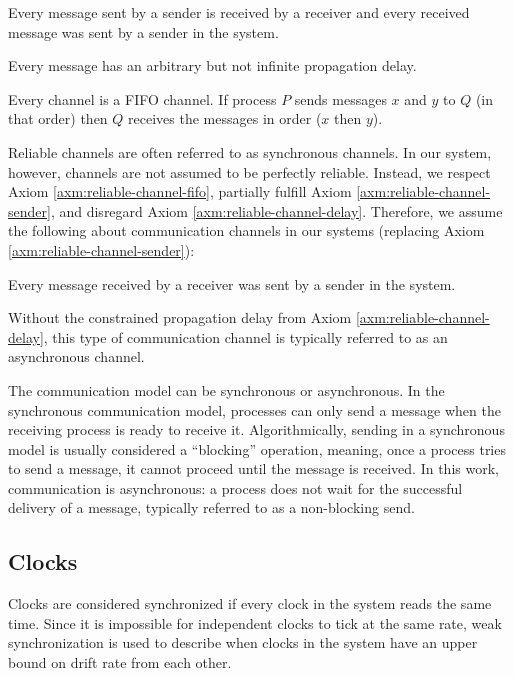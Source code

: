 \begin{axm}
    \label{axm:reliable-channel-sender}
    Every message sent by a sender is received by a receiver and every received message was sent by a sender in the system. 
\end{axm}

\begin{axm}
    \label{axm:reliable-channel-delay}
    Every message has an arbitrary but not infinite propagation delay.
\end{axm}

\begin{axm}
    \label{axm:reliable-channel-fifo}
    Every channel is a \ac{FIFO} channel. If process $P$ sends messages $x$ and $y$ to $Q$ (in that order) then $Q$ receives the messages in order ($x$ then $y$).
\end{axm}

Reliable channels are often referred to as synchronous channels.
In our system, however, channels are not assumed to be perfectly reliable.
Instead, we respect Axiom \ref{axm:reliable-channel-fifo}, partially fulfill Axiom \ref{axm:reliable-channel-sender}, and disregard Axiom \ref{axm:reliable-channel-delay}.
Therefore, we assume the following about communication channels in our systems (replacing Axiom \ref{axm:reliable-channel-sender}):

\begin{axm}
    Every message received by a receiver was sent by a sender in the system.
\end{axm}

Without the constrained propagation delay from Axiom \ref{axm:reliable-channel-delay}, this type of communication channel is typically referred to as an asynchronous channel.

The communication model can be synchronous or asynchronous.
In the synchronous communication model, processes can only send a message when the receiving process is ready to receive it.
Algorithmically, sending in a synchronous model is usually considered a ``blocking'' operation, meaning, once a process tries to send a message, it cannot proceed until the message is received.
In this work, communication is asynchronous: a process does not wait for the successful delivery of a message, typically referred to as a non-blocking send.

\subsection{Clocks}
Clocks are considered synchronized if every clock in the system reads the same time.
Since it is impossible for independent clocks to tick at the same rate, weak synchronization is used to describe when clocks in the system have an upper bound on drift rate from each other.


